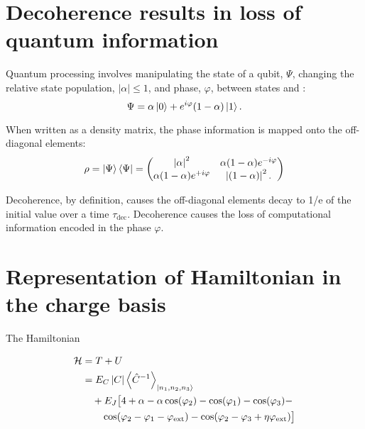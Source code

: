 
\section{Decoherence results in loss of quantum information}
\label{sec:decoh-results-loss}

\noindent Quantum  processing involves manipulating  the state of  a qubit, $\Psi$,  changing the
relative state population, $\ensuremath{|\alpha|} \le 1$, and phase, $\varphi$, between states  and
:
\begin{equation}
  \label{eq:4}
  \Psi = \alpha\Ket{0} + e^{i\varphi}(1-\alpha)\Ket{1}.
\end{equation}

\noindent  When  written as  a  density  matrix, the  phase  information  is mapped  onto  the
off-diagonal elements:
\begin{equation}
  \label{eq:5}
  \rho = \ket{\Psi}\bra{\Psi} = \begin{pmatrix}
    \left|\alpha\right|^2  & \alpha(1-\alpha)e^{-i\varphi}\\
    \alpha(1-\alpha)e^{+i\varphi} & \left|(1-\alpha)\right|^2.
  \end{pmatrix}
\end{equation}

\noindent Decoherence,  by definition, causes  the off-diagonal elements  decay to 1/e  of the
initial  value over  a time  $\tau_{\text{dec}}$. Decoherence  causes the  loss of  computational
information encoded in the phase $\varphi$.

\section{Representation of Hamiltonian in the charge basis}
\label{sec:repr-hamilt-charge}

\noindent The Hamiltonian

\begin{equation}
  \label{eq:hamitlian_revisited}
  \begin{aligned}
    \mathcal{H} & = T + U\\
    & = E_C \left|C\right| \left\langle \hat{C}^{-1} \right\rangle_{\Ket{n_{1}, n_2, n_3}} \\
    & \quad+  E_J\big[4 + \alpha - \alpha\cos(\varphi_{2}) -\cos(\varphi_{1}) -\cos(\varphi_{3}) - \\
    &  \qquad  \cos(\varphi_{2}   -  \varphi_{1}  -  \varphi_{\text{ext}})  -  \cos(\varphi_{2}   -  \varphi_{3}  +
    \eta\varphi_{\text{ext}})\big]
  \end{aligned}
\end{equation}

